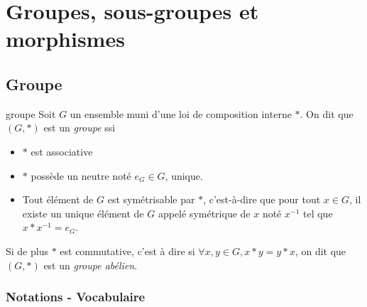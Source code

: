 
\section{Groupes, sous-groupes et morphismes }
\subsection{Groupe}

\begin{definition}{groupe}{}
    Soit $G$ un ensemble muni d'une loi de composition interne $\ast$. 
    On dit que $(G, \ast)$ est un \emph{groupe} ssi 
    \begin{itemize}
        \item $\ast$ est associative
        \item $\ast$ possède un neutre noté $e_G \in G$, unique.
        \item Tout élément de $G$ est symétrisable par $\ast$, c'est-à-dire que pour tout $x \in G$, 
        il existe un unique élément de $G$ appelé symétrique de $x$ noté $x^{-1}$ tel que $x \ast x^{-1} = e_G$.
    \end{itemize}

    Si de plus $\ast$ est commutative, c'est à dire si $\forall x, y \in G, x \ast y = y \ast x$, 
    on dit que $(G, \ast)$ est un \emph{groupe abélien}.
\end{definition}


\subsubsection{Notations - Vocabulaire }

